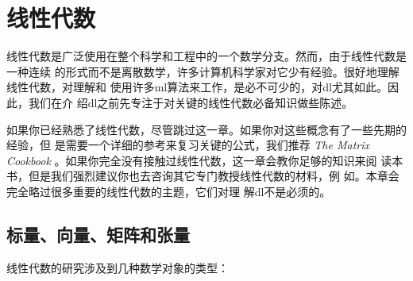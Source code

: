 \chapter{线性代数}
\label{ch:linear_algebra}

线性代数是广泛使用在整个科学和工程中的一个数学分支。然而，由于线性代数是一种连续
的形式而不是离散数学，许多计算机科学家对它少有经验。很好地理解线性代数，对理解和
使用许多\gls*{ml}算法来工作，是必不可少的，对\gls*{dl}尤其如此。因此，我们在介
绍\gls*{dl}之前先专注于对关键的线性代数必备知识做些陈述。

如果你已经熟悉了线性代数，尽管跳过这一章。如果你对这些概念有了一些先期的经验，但
是需要一个详细的参考来复习关键的公式，我们推荐 \emph{The Matrix Cookbook}
\citep{matrix-cookbook}。如果你完全没有接触过线性代数，这一章会教你足够的知识来阅
读本书，但是我们强烈建议你也去咨询其它专门教授线性代数的材料，例
如\citep{shilov1977linear}。本章会完全略过很多重要的线性代数的主题，它们对理
解\gls*{dl}不是必须的。

\section{标量、向量、矩阵和张量}
\label{sec:scalars_vectors_matrices_and_tensors}

线性代数的研究涉及到几种数学对象的类型：

